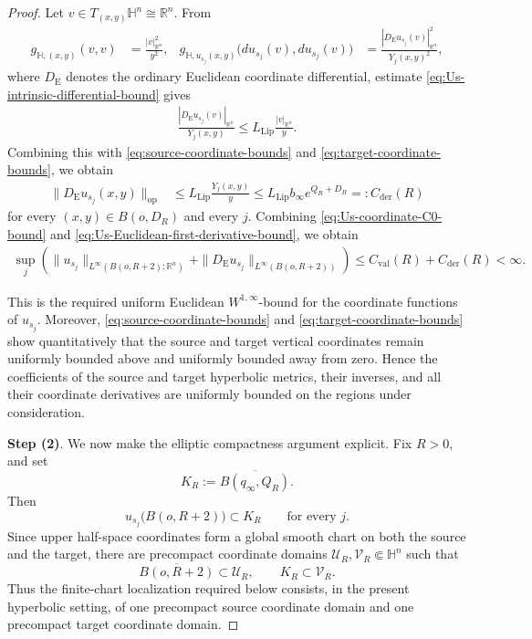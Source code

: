 \documentclass[11pt]{amsart}
\theoremstyle{plain}
\theoremstyle{plain}
\theoremstyle{plain}
\newcommand{\Hn}{\mathbb H^n}
\numberwithin{equation}{section}
\begin{document}
\begin{proof}
Let \(v\in T_{(x,y)}\Hn\cong\mathbb R^{n}\).  From
\begin{align}
g_{\mathbb H,(x,y)}(v,v)
&=\frac{|v|_{\mathbb R^{n}}^2}{y^2},
&
g_{\mathbb H,u_{s_j}(x,y)}
\bigl(du_{s_j}(v),du_{s_j}(v)\bigr)
&=
\frac{|D_{\mathrm E}u_{s_j}(v)|_{\mathbb R^{n}}^2}
{Y_j(x,y)^2},
\nonumber
\end{align}
where \(D_{\mathrm E}\) denotes the ordinary Euclidean coordinate
differential, estimate \eqref{eq:Us-intrinsic-differential-bound} gives
\begin{align}
\frac{|D_{\mathrm E}u_{s_j}(v)|_{\mathbb R^{n}}}{Y_j(x,y)}
\leq
L_{\mathrm{Lip}}
\frac{|v|_{\mathbb R^{n}}}{y}.
\nonumber
\end{align}
Combining this with \eqref{eq:source-coordinate-bounds} and
\eqref{eq:target-coordinate-bounds}, we obtain
\begin{align}
\lVert D_{\mathrm E}u_{s_j}(x,y)\rVert_{\operatorname{op}}
&\leq
L_{\mathrm{Lip}}\frac{Y_j(x,y)}{y}\leq
L_{\mathrm{Lip}}b_\infty e^{Q_R+D_R}
=:C_{\mathrm{der}}(R)
\label{eq:Us-Euclidean-first-derivative-bound}
\end{align}
for every \((x,y)\in B(o,D_R)\) and every \(j\).
Combining \eqref{eq:Us-coordinate-C0-bound} and
\eqref{eq:Us-Euclidean-first-derivative-bound}, we obtain
\begin{align}
\sup_j\left(
\|u_{s_j}\|_{L^\infty(B(o,R+2);\mathbb R^{n})}
+
\|D_{\mathrm E}u_{s_j}\|_{L^\infty(B(o,R+2))}
\right)
\leq
C_{\mathrm{val}}(R)+C_{\mathrm{der}}(R)
<\infty.
\label{eq:Us-uniform-coordinate-W1infty}
\end{align}

This is the required uniform Euclidean
\(W^{1,\infty}\)-bound for the coordinate functions of \(u_{s_j}\).
Moreover, \eqref{eq:source-coordinate-bounds} and
\eqref{eq:target-coordinate-bounds} show quantitatively that the source
and target vertical coordinates remain uniformly bounded above and
uniformly bounded away from zero.  Hence the coefficients of the source
and target hyperbolic metrics, their inverses, and all their coordinate
derivatives are uniformly bounded on the regions under consideration.

\textbf{Step (2)}. We now make the elliptic compactness argument
explicit.  Fix \(R>0\), and set
\[
K_R:=\overline{B(q_\infty,Q_R)}.
\]
Then
\[
u_{s_j}\bigl(B(o,R+2)\bigr)\subset K_R
\qquad\text{for every }j.
\]
Since upper half-space coordinates form a global smooth chart on both the
source and the target, there are precompact coordinate domains
\(\mathcal U_R,\mathcal V_R\Subset\Hn\) such that
\[
\overline{B(o,R+2)}\subset\mathcal U_R,
\qquad
K_R\subset\mathcal V_R.
\]
Thus the finite-chart localization required below consists, in the
present hyperbolic setting, of one precompact source coordinate domain and
one precompact target coordinate domain.


\end{proof}
\end{document}
